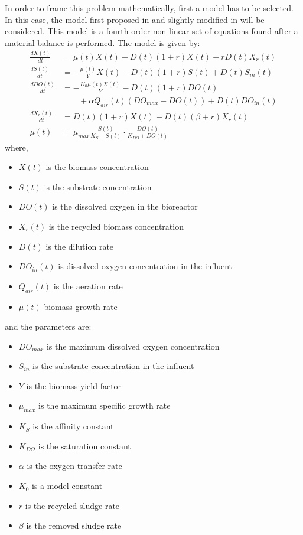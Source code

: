 In order to frame this problem mathematically, first a model has to be selected. In this case, the model first proposed in \cite{Nejjari1999} and slightly modified in \cite{Han2008} will be considered. This model is a fourth order non-linear set of equations found after a material balance is performed. The model is given by:
\begin{equation}
	\begin{split}
	\frac{d X (t)}{dt} &= \mu(t) X(t) - D(t) (1+r)X(t)+rD(t)X_r(t)\\
	\frac{d S (t)}{dt} &= -\frac{\mu(t)}{Y}X(t) - D(t)(1+r)S(t)+D(t)S_{in}(t)\\
	\frac{d DO (t)}{dt} &= - \frac{K_0 \mu(t) X(t)}{Y} - D(t)(1+r)DO(t)\\
					& \qquad + \alpha Q_{air}(t) \left(DO_{max} - DO(t)\right) +D(t) DO_{in}(t)\\
	\frac{d X_r (t)}{dt} &= D(t) (1+r) X(t)- D(t) \left( \beta + r \right) X_r(t)\\
	\mu(t) &= \mu_{max} \frac{S(t)}{K_S + S(t)} \cdot \frac{DO(t)}{K_{DO}+DO(t)}
	\end{split}
	\label{frac:WWTPModel}
\end{equation}
%
where,
\begin{itemize}
	\item $X(t)$ is the biomass concentration
	\item $S(t)$ is the substrate concentration
	\item $DO(t)$ is the dissolved oxygen in the bioreactor
	\item $X_r(t)$ is the recycled biomass concentration
	\item $D(t)$ is the dilution rate
	\item $DO_{in}(t)$ is dissolved oxygen concentration in the influent
	\item $Q_{air}(t)$ is the aeration rate
	\item $\mu(t)$ biomass growth rate
\end{itemize}
%
and the parameters are:
\begin{itemize}
	\item $DO_{max}$ is the maximum dissolved oxygen concentration
	\item $S_{in}$ is the substrate concentration in the influent
	\item $Y$ is the biomass yield factor
	\item $\mu_{max}$ is the maximum specific growth rate
	\item $K_S$ is the affinity constant
	\item $K_{DO}$ is the saturation constant
	\item $\alpha$ is the oxygen transfer rate
	\item $K_0$ is a model constant
	\item $r$ is the recycled sludge rate
	\item $\beta$ is the removed sludge rate
\end{itemize}

